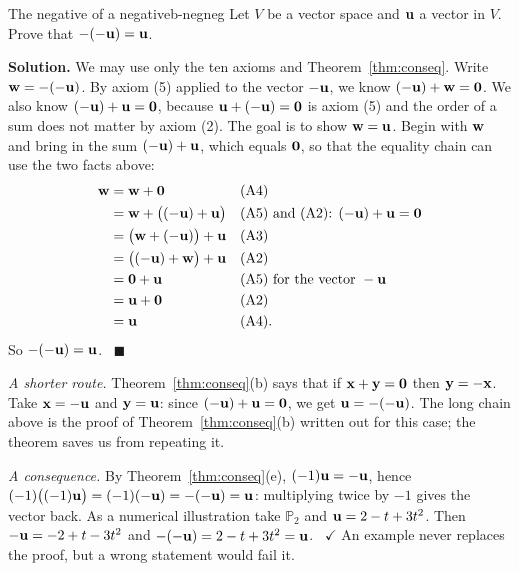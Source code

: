 \documentclass[11pt]{article}
\begin{document}
\begin{exmp}{The negative of a negative}{b-negneg}
Let $V$ be a vector space and $\mathbf{u}$ a vector in $V$. Prove that $-(-\mathbf{u})=\mathbf{u}$.

\textbf{Solution.} We may use only the ten axioms and Theorem~\ref{thm:conseq}. Write $\mathbf{w}=-(-\mathbf{u})$. By axiom (5) applied to the vector $-\mathbf{u}$, we know $(-\mathbf{u})+\mathbf{w}=\mathbf{0}$. We also know $(-\mathbf{u})+\mathbf{u}=\mathbf{0}$, because $\mathbf{u}+(-\mathbf{u})=\mathbf{0}$ is axiom (5) and the order of a sum does not matter by axiom (2). The goal is to show $\mathbf{w}=\mathbf{u}$. Begin with $\mathbf{w}$ and bring in the sum $(-\mathbf{u})+\mathbf{u}$, which equals $\mathbf{0}$, so that the equality chain can use the two facts above:
\begin{align*}
\mathbf{w}&=\mathbf{w}+\mathbf{0} &&\text{(A4)}\\
&=\mathbf{w}+\bigl((-\mathbf{u})+\mathbf{u}\bigr) &&\text{(A5) and (A2): } (-\mathbf{u})+\mathbf{u}=\mathbf{0}\\
&=\bigl(\mathbf{w}+(-\mathbf{u})\bigr)+\mathbf{u} &&\text{(A3)}\\
&=\bigl((-\mathbf{u})+\mathbf{w}\bigr)+\mathbf{u} &&\text{(A2)}\\
&=\mathbf{0}+\mathbf{u} &&\text{(A5) for the vector } -\mathbf{u}\\
&=\mathbf{u}+\mathbf{0} &&\text{(A2)}\\
&=\mathbf{u} &&\text{(A4)}.
\end{align*}
So $-(-\mathbf{u})=\mathbf{u}$. \ $\blacksquare$

\emph{A shorter route.} Theorem~\ref{thm:conseq}(b) says that if $\mathbf{x}+\mathbf{y}=\mathbf{0}$ then $\mathbf{y}=-\mathbf{x}$. Take $\mathbf{x}=-\mathbf{u}$ and $\mathbf{y}=\mathbf{u}$: since $(-\mathbf{u})+\mathbf{u}=\mathbf{0}$, we get $\mathbf{u}=-(-\mathbf{u})$. The long chain above is the proof of Theorem~\ref{thm:conseq}(b) written out for this case; the theorem saves us from repeating it.

\emph{A consequence.} By Theorem~\ref{thm:conseq}(e), $(-1)\mathbf{u}=-\mathbf{u}$, hence $(-1)\bigl((-1)\mathbf{u}\bigr)=(-1)(-\mathbf{u})=-(-\mathbf{u})=\mathbf{u}$: multiplying twice by $-1$ gives the vector back. As a numerical illustration take $\mathbb{P}_2$ and $\mathbf{u}=2-t+3t^2$. Then $-\mathbf{u}=-2+t-3t^2$ and $-(-\mathbf{u})=2-t+3t^2=\mathbf{u}$. \ $\checkmark$ An example never replaces the proof, but a wrong statement would fail it.
\end{exmp}
\end{document}
